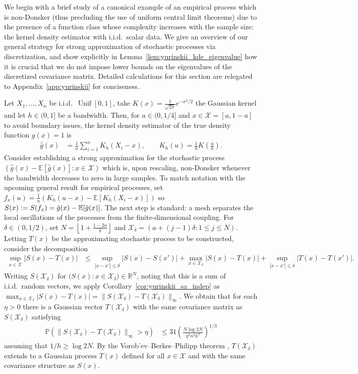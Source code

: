 \documentclass[11pt,lof]{puthesis}
\renewcommand{\P}{\ensuremath{\mathbb{P}}}
\newcommand{\E}{\ensuremath{\mathbb{E}}}
\newcommand{\cX}{\ensuremath{\mathcal{X}}}
\DeclareMathOperator{\Unif}{Unif}
\theoremstyle{break}
\theoremstyle{proof}
\begin{document}
We begin with a brief study of a canonical example of an empirical process
which is non-Donsker (thus precluding the use of uniform central limit
theorems) due to the presence of a function class whose complexity increases
with the sample size: the kernel density estimator with i.i.d.\ scalar data.
We give an overview of our general strategy for
strong approximation of stochastic processes
via discretization, and show explicitly in
Lemma~\ref{lem:yurinskii_kde_eigenvalue}
how it is crucial
that we do not impose lower bounds on the eigenvalues of the discretized
covariance matrix. Detailed calculations for this section are
relegated to Appendix~\ref{app:yurinskii} for conciseness.

Let $X_1, \ldots, X_n$ be i.i.d.\ $\Unif[0,1]$, take
$K(x) = \frac{1}{\sqrt{2 \pi}} e^{-x^2/2}$ the Gaussian kernel and let
$h \in (0,1]$ be a bandwidth. Then, for $a \in (0,1/4]$ and
$x \in \cX = [a, 1-a]$ to avoid boundary issues, the kernel density estimator
of the true density function $g(x) = 1$ is
%
\begin{align*}
\hat g(x)
&=
\frac{1}{n}
\sum_{i=1}^{n}
K_h( X_i - x),
\qquad K_h(u) = \frac{1}{h} K\left( \frac{u}{h} \right).
\end{align*}
%
Consider establishing a strong approximation for the stochastic process
$(\hat g(x)-\E [ \hat g(x) ] : x\in\cX)$
which is, upon rescaling, non-Donsker whenever
the bandwidth decreases to zero in large samples.
To match notation with the upcoming
general result for empirical processes, set
$f_x(u) = \frac{1}{n} (K_h( u - x) - \E[K_h( X_i - x)])$
so $S(x) \vcentcolon= S(f_x) = \hat g(x)-\E [ \hat g(x) ]$.
The next step is standard: a
mesh separates the local oscillations of the processes from
the finite-dimensional coupling.
For $\delta \in (0,1/2)$, set
$N = \left\lfloor 1 + \frac{1 - 2a}{\delta} \right\rfloor$
and $\cX_\delta = (a + (j-1)\delta : 1 \leq j \leq N)$.
Letting $T(x)$ be the approximating stochastic
process to be constructed, consider the decomposition
%
\begin{align*}
\sup_{x \in \cX}
\big|S(x) - T(x)\big|
&\leq
\sup_{|x-x'| \leq \delta}
\big|S(x) - S(x') \big|
+ \max_{x \in \cX_\delta}
|S(x) - T(x)|
+ \sup_{|x-x'| \leq \delta}
\big|T(x) - T(x')\big|.
\end{align*}
%
Writing $S(\cX_\delta)$ for
$\big(S(x) : x \in \cX_\delta\big)\in \mathbb{R}^N$,
noting that this is a sum of i.i.d.\ random vectors, we apply
Corollary~\ref{cor:yurinskii_sa_indep} as
$\max_{x \in \cX_\delta} |S(x) - T(x)|
= \| S(\cX_\delta) - T(\cX_\delta) \|_\infty$.
We obtain that for each $\eta > 0$ there is a Gaussian vector
$T(\cX_\delta)$ with the same covariance matrix as $S(\cX_\delta)$ satisfying
%
\begin{align*}
\P\left(
\|S(\cX_\delta) - T(\cX_\delta)\|_\infty > \eta
\right)
&\leq
31 \left(
\frac{N \log 2 N}{\eta^3 n^2 h^2}
\right)^{1/3}
\end{align*}
%
assuming that $1/h \geq \log 2 N$.
By the Vorob'ev--Berkes--Philipp theorem
\citep[Theorem~1.1.10]{dudley1999uniform},
$T(\cX_\delta)$ extends to a Gaussian process $T(x)$
defined for all $x \in \cX$ and with the same covariance structure
as $S(x)$.
\end{document}
